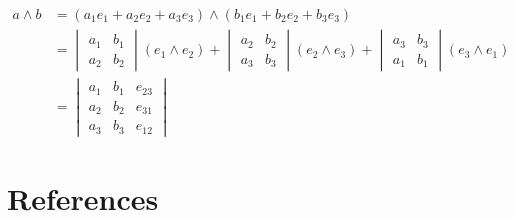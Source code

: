 \documentclass{article}
\begin{document}
\begin{equation}\begin{split}
  a \wedge b
  &= \left( a_1 e_1 + a_2 e_2 + a_3 e_3 \right)
  \wedge \left( b_1 e_1 + b_2 e_2 + b_3 e_3 \right) \\
  &= \begin{vmatrix}
  a_1 & b_1 \\
  a_2 & b_2
  \end{vmatrix} \left( e_1 \wedge e_2 \right)
  + \begin{vmatrix}
  a_2 & b_2 \\
  a_3 & b_3
  \end{vmatrix} \left( e_2 \wedge e_3 \right)
  + \begin{vmatrix}
  a_3 & b_3 \\
  a_1 & b_1
  \end{vmatrix} \left( e_3 \wedge e_1 \right) \\
  &= \begin{vmatrix}
  a_1 & b_1 & e_{23} \\
  a_2 & b_2 & e_{31} \\
  a_3 & b_3 & e_{12}
  \end{vmatrix}
\end{split}\end{equation}

\newpage

\section[references]{References}



\end{document}
